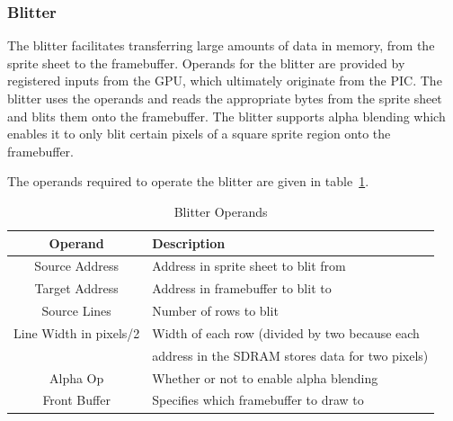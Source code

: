 \documentclass{report}
\begin{document}
\subsubsection{Blitter}
The blitter facilitates transferring large amounts of data in memory,
from the sprite sheet to the framebuffer. Operands for the blitter are
provided by registered inputs from the GPU, which ultimately originate
from the PIC. The blitter uses the operands and reads the appropriate
bytes from the sprite sheet and blits them onto the framebuffer. The
blitter supports alpha blending which enables it to only blit certain
pixels of a square sprite region onto the framebuffer.

The operands required to operate the blitter are given in
table~\ref{tab:blitter_operands}.

\begin{table}[htb!]
    \begin{center}
        \begin{tabular}{ | c | l | }
            \hline
            Operand & Description \\
            \hline
            Source Address & Address in sprite sheet to blit from \\
            \hline
            Target Address & Address in framebuffer to blit to \\
            \hline
            Source Lines & Number of rows to blit \\
            \hline
            Line Width in pixels/2 & Width of each row (divided by two
            because each \\
            & address in the SDRAM stores data for two pixels) \\
            \hline
            Alpha Op & Whether or not to enable alpha blending \\
            \hline
            Front Buffer & Specifies which framebuffer to draw to \\
            \hline
        \end{tabular}
    \end{center}
    \caption{Blitter Operands}
    \label{tab:blitter_operands}
\end{table}
\end{document}
